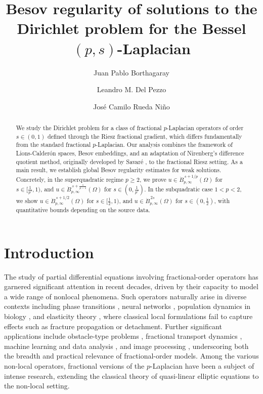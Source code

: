 \documentclass[]{amsart}
\title[Besov regularity for the Bessel \( (p,s) \)-Laplacian]{Besov regularity of solutions to the Dirichlet problem for the Bessel \( (p,s) \)-Laplacian}
\author[J. P.~Borthagaray]{Juan Pablo Borthagaray}
\author[L. M. Del Pezzo]{Leandro M. Del Pezzo}
\author[J. C. Rueda Ni\~no]{Jos\'e Camilo Rueda Ni\~no}
\theoremstyle{definition}
\theoremstyle{definition}
\theoremstyle{remark}
\numberwithin{equation}{section}
\begin{document}
\begin{abstract}
	We study the Dirichlet problem for a class of fractional $p$-Laplacian operators of order $s \in (0,1)$ defined through the Riesz fractional gradient, which differs fundamentally from the standard
    fractional $p$-Laplacian. Our analysis combines the framework of Lions-Calderón spaces, Besov embeddings, and an adaptation of Nirenberg’s difference quotient method, originally developed by Savaré \cite{savare1998regularity}, to the fractional Riesz setting. As a main result, we establish global Besov regularity estimates for weak solutions. Concretely, in the superquadratic regime \(p \ge 2\), we prove \(u \in \dot{B}_{p,\infty}^{\,s+1/p}(\Omega)\) for \(s \in [\tfrac{1}{p'},1)\), and \(u \in \dot{B}_{p,\infty}^{\,s+\frac{s}{p-1}}(\Omega)\) for \(s \in (0,\tfrac{1}{p'})\). In the subquadratic case \(1<p<2\), we show \(u \in \dot{B}_{p,\infty}^{\,s+1/2}(\Omega)\) for \(s \in [\tfrac{1}{2},1)\), and \(u \in \dot{B}_{p,\infty}^{\,2s}(\Omega)\) for \(s \in (0,\tfrac12)\), with quantitative bounds depending on the source data.
\end{abstract}


	\maketitle

	
	\section{Introduction}
The study of partial differential equations involving fractional-order operators has garnered significant attention in recent decades, driven by their capacity to model a wide range of nonlocal phenomena. Such operators naturally arise in diverse contexts including phase transitions \cite{wang2002metastability}, neural networks \cite{zhang2004existence}, population dynamics in biology \cite{carrillo2005spatial}, and elasticity theory \cite{silling2000reformulation,bellido2020fractional}, where classical local formulations fail to capture effects such as fracture propagation or detachment. Further significant applications include obstacle-type problems \cite{campos2023fractional,campos2024implicit}, fractional transport dynamics \cite{azevedo2024nonlocal}, machine learning and data analysis \cite{lu2024nonparametric}, and image processing \cite{gilboa2007nonlocal}, underscoring both the breadth and practical relevance of fractional-order models. Among the various non-local operators, fractional versions of the \( p \)-Laplacian have been a subject of intense research, extending the classical theory of quasi-linear elliptic equations to the non-local setting.
\end{document}
